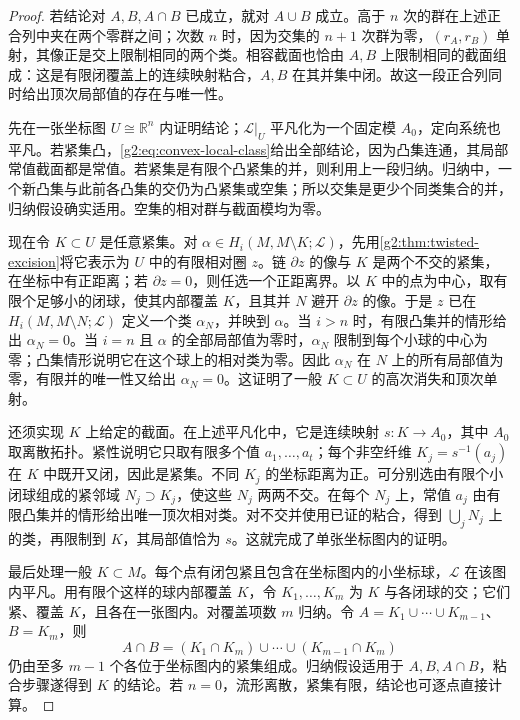 \begin{proof}
	若结论对 \(A,B,A\cap B\) 已成立，就对 \(A\cup B\) 成立。高于 \(n\) 次的群在上述正合列中夹在两个零群之间；次数 \(n\) 时，因为交集的 \(n+1\) 次群为零，\((r_A,r_B)\) 单射，其像正是交上限制相同的两个类。相容截面也恰由 \(A,B\) 上限制相同的截面组成：这是有限闭覆盖上的连续映射粘合，\(A,B\) 在其并集中闭。故这一段正合列同时给出顶次局部值的存在与唯一性。

	先在一张坐标图 \(U\cong\mathbb R^n\) 内证明结论；\(\mathcal L|_U\) 平凡化为一个固定模 \(A_0\)，定向系统也平凡。若紧集凸，\eqref{g2:eq:convex-local-class}给出全部结论，因为凸集连通，其局部常值截面都是常值。若紧集是有限个凸紧集的并，则利用上一段归纳。归纳中，一个新凸集与此前各凸集的交仍为凸紧集或空集；所以交集是更少个同类集合的并，归纳假设确实适用。空集的相对群与截面模均为零。

	现在令 \(K\subset U\) 是任意紧集。对 \(\alpha\in H_i(M,M\setminus K;\mathcal L)\)，先用\cref{g2:thm:twisted-excision}将它表示为 \(U\) 中的有限相对圈 \(z\)。链 \(\partial z\) 的像与 \(K\) 是两个不交的紧集，在坐标中有正距离；若 \(\partial z=0\)，则任选一个正距离界。以 \(K\) 中的点为中心，取有限个足够小的闭球，使其内部覆盖 \(K\)，且其并 \(N\) 避开 \(\partial z\) 的像。于是 \(z\) 已在 \(H_i(M,M\setminus N;\mathcal L)\) 定义一个类 \(\alpha_N\)，并映到 \(\alpha\)。当 \(i>n\) 时，有限凸集并的情形给出 \(\alpha_N=0\)。当 \(i=n\) 且 \(\alpha\) 的全部局部值为零时，\(\alpha_N\) 限制到每个小球的中心为零；凸集情形说明它在这个球上的相对类为零。因此 \(\alpha_N\) 在 \(N\) 上的所有局部值为零，有限并的唯一性又给出 \(\alpha_N=0\)。这证明了一般 \(K\subset U\) 的高次消失和顶次单射。

	还须实现 \(K\) 上给定的截面。在上述平凡化中，它是连续映射 \(s:K\to A_0\)，其中 \(A_0\) 取离散拓扑。紧性说明它只取有限多个值 \(a_1,\ldots,a_t\)；每个非空纤维 \(K_j=s^{-1}(a_j)\) 在 \(K\) 中既开又闭，因此是紧集。不同 \(K_j\) 的坐标距离为正。可分别选由有限个小闭球组成的紧邻域 \(N_j\supset K_j\)，使这些 \(N_j\) 两两不交。在每个 \(N_j\) 上，常值 \(a_j\) 由有限凸集并的情形给出唯一顶次相对类。对不交并使用已证的粘合，得到 \(\bigcup_jN_j\) 上的类，再限制到 \(K\)，其局部值恰为 \(s\)。这就完成了单张坐标图内的证明。

	最后处理一般 \(K\subset M\)。每个点有闭包紧且包含在坐标图内的小坐标球，\(\mathcal L\) 在该图内平凡。用有限个这样的球内部覆盖 \(K\)，令 \(K_1,\ldots,K_m\) 为 \(K\) 与各闭球的交；它们紧、覆盖 \(K\)，且各在一张图内。对覆盖项数 \(m\) 归纳。令 \(A=K_1\cup\cdots\cup K_{m-1}\)、\(B=K_m\)，则
	\[
		A\cap B=(K_1\cap K_m)\cup\cdots\cup(K_{m-1}\cap K_m)
	\]
	仍由至多 \(m-1\) 个各位于坐标图内的紧集组成。归纳假设适用于 \(A,B,A\cap B\)，粘合步骤遂得到 \(K\) 的结论。若 \(n=0\)，流形离散，紧集有限，结论也可逐点直接计算。
\end{proof}

